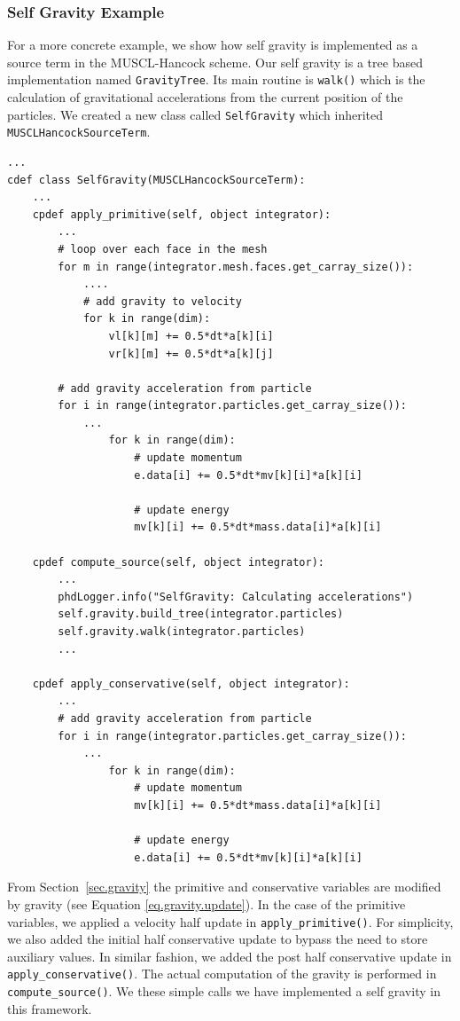 \subsubsection{Self Gravity Example}
For a more concrete example, we show how self gravity is implemented as a source term
in the MUSCL-Hancock scheme. Our self gravity is a tree based implementation
named \lstinline{GravityTree}. Its main routine is \lstinline{walk()} which is the
calculation of gravitational accelerations from the current position of the particles.
We created a new class called \lstinline{SelfGravity} which inherited \lstinline{MUSCLHancockSourceTerm}. 
\begin{lstlisting}
...
cdef class SelfGravity(MUSCLHancockSourceTerm):
    ...
    cpdef apply_primitive(self, object integrator):
    	...
        # loop over each face in the mesh 
        for m in range(integrator.mesh.faces.get_carray_size()):
            ....
            # add gravity to velocity
            for k in range(dim):
                vl[k][m] += 0.5*dt*a[k][i]
                vr[k][m] += 0.5*dt*a[k][j]

        # add gravity acceleration from particle
        for i in range(integrator.particles.get_carray_size()):
            ...
                for k in range(dim):
                    # update momentum
                    e.data[i] += 0.5*dt*mv[k][i]*a[k][i]

                    # update energy 
                    mv[k][i] += 0.5*dt*mass.data[i]*a[k][i]
                    
    cpdef compute_source(self, object integrator):
    	...
        phdLogger.info("SelfGravity: Calculating accelerations")
        self.gravity.build_tree(integrator.particles)
        self.gravity.walk(integrator.particles)
        ...

    cpdef apply_conservative(self, object integrator):
        ...
        # add gravity acceleration from particle
        for i in range(integrator.particles.get_carray_size()):
            ...
                for k in range(dim):
                    # update momentum
                    mv[k][i] += 0.5*dt*mass.data[i]*a[k][i]

                    # update energy 
                    e.data[i] += 0.5*dt*mv[k][i]*a[k][i]
\end{lstlisting}
From Section~\ref{sec.gravity} the primitive and conservative variables are modified by gravity
(see Equation \ref{eq.gravity.update}). In the case of the primitive variables, we applied a
velocity half update in \lstinline{apply_primitive()}. For simplicity, we also added the initial half 
conservative update to bypass the need to store auxiliary values. In similar fashion,
we added the post half conservative update in \lstinline{apply_conservative()}. The actual computation
of the gravity is performed in \lstinline{compute_source()}. We these simple calls we have implemented
a self gravity in this framework.
